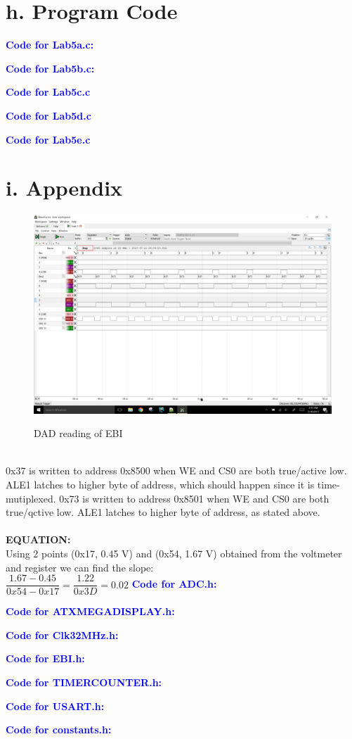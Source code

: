 \documentclass[11pt]{article}
\theoremstyle{plain}
\theoremstyle{definition}
\begin{document}
\newpage
\section*{h. Program Code}
\textbf{\textcolor{blue}{Code for Lab5a.c:}}

\newpage
\textbf{\textcolor{blue}{Code for Lab5b.c:}}

\newpage
\textbf{\textcolor{blue}{Code for Lab5c.c}}

\newpage
\textbf{\textcolor{blue}{Code for Lab5d.c}}

\newpage
\textbf{\textcolor{blue}{Code for Lab5e.c}}

\newpage
\section*{i. Appendix}
\begin{figure}[H]
	\centering
	\includegraphics[width=\textwidth]{Parta}
	\label{fig:c}
	\caption{DAD reading of EBI}
\end{figure}
\\
0x37 is written to address 0x8500 when WE and CS0 are both true/active low. ALE1 latches to higher byte of address, which should happen since it is time-mutiplexed. 0x73 is written to address 0x8501 when WE and CS0 are both true/qctive low. ALE1 latches to higher byte of address, as stated above.
\\
\\\textbf{EQUATION:}\\
Using 2 points (0x17, 0.45 V) and (0x54, 1.67 V) obtained from the voltmeter and register we can find the slope:\\
$\dfrac{1.67 - 0.45}{0x54-0x17} = \dfrac{1.22}{0x3D} = 0.02$
%
%
\newpage
\textbf{\textcolor{blue}{Code for ADC.h:}}

\newpage
\textbf{\textcolor{blue}{Code for ATXMEGA\textunderscore DISPLAY.h:}}

\newpage
\textbf{\textcolor{blue}{Code for Clk\textunderscore 32MHz.h:}}

\newpage
\textbf{\textcolor{blue}{Code for EBI.h:}}

\newpage
\textbf{\textcolor{blue}{Code for TIMER\textunderscore COUNTER.h:}}

\newpage
\textbf{\textcolor{blue}{Code for USART.h:}}

\newpage
\textbf{\textcolor{blue}{Code for constants.h:}}

\end{document}
